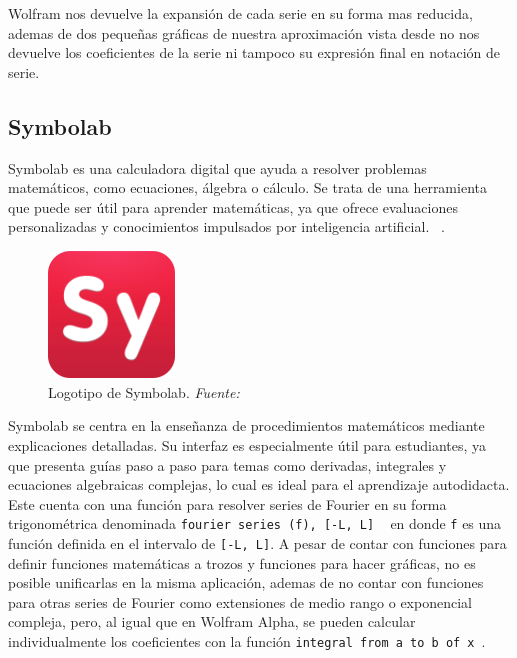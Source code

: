 Wolfram nos devuelve la expansión de cada serie en su forma mas reducida, ademas de dos pequeñas gráficas de nuestra aproximación vista desde  no nos devuelve los coeficientes de la serie ni tampoco su expresión final en notación de serie.

\subsection{Symbolab}
Symbolab es una calculadora digital que ayuda a resolver problemas matemáticos, como ecuaciones, álgebra o cálculo. Se trata de una herramienta que puede ser útil para aprender matemáticas, ya que ofrece evaluaciones personalizadas y conocimientos impulsados por inteligencia artificial. ~\cite{symbolabDocs}. 
\begin{figure}[H]
	\centering
	\includegraphics[width=0.3\textwidth]{img/chapter02/logo_symbolab.png}
	\caption[Logotipo de Symbolab.]{Logotipo de Symbolab. \textit{Fuente: ~\cite{symbolabDocs}}}
	\label{fig:logo-symbolab}  %
\end{figure}
Symbolab se centra en la enseñanza de procedimientos matemáticos mediante explicaciones detalladas. Su interfaz es especialmente útil para estudiantes, ya que presenta guías paso a paso para temas como derivadas, integrales y ecuaciones algebraicas complejas, lo cual es ideal para el aprendizaje autodidacta. Este cuenta con una función para resolver series de Fourier en su forma trigonométrica denominada \texttt{fourier series (f), [-L, L]} ~\cite{symbolabDocs} en donde \texttt{f} es una función definida en el intervalo de \texttt{[-L, L]}. A pesar de contar con funciones para definir funciones matemáticas a trozos y funciones para hacer gráficas, no es posible unificarlas en la misma aplicación, ademas de no contar con funciones para otras series de Fourier como extensiones de medio rango o exponencial compleja, pero, al igual que en Wolfram Alpha, se pueden calcular individualmente los coeficientes con la función \texttt{integral from a to b of x}~\cite{symbolabDocs}.

